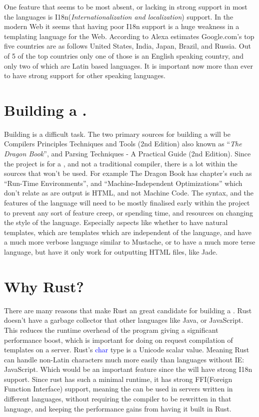 One feature that seems to be most absent, or lacking in strong support in most the languages is I18n(\textit{Internationalization and localization}) support. In the modern Web it seems that having poor I18n support is a huge weakness in a templating language for the Web. According to Alexa estimates Google.com's top five countries are as follows United States, India, Japan, Brazil, and Russia. Out of 5 of the top countries only one of those is an English speaking country, and only two of which are Latin based languages. It is important now more than ever to have strong support for other speaking languages.
\newpage
\section{Building a \compiler{}.}
Building \compiler{} is a difficult task. The two primary sources for building a \compiler{} will be Compilers Principles Techniques and Tools (2nd Edition) also known as ``\textit{The Dragon Book}''\cite{DragonBook}, and Parsing Techniques - A Practical Guide (2nd Edition)\cite{ParseTech}. Since the project is for a \compiler{}, and not a traditional compiler, there is a lot within the sources that won't be used. For example The Dragon Book has chapter's such as ``Run-Time Environments'', and ``Machine-Independent Optimizations'' which don't relate as are output is HTML, and not Machine Code. The syntax, and the features of the language will need to be mostly finalised early within the project to prevent any sort of feature creep, or spending time, and resources on changing the style of the language. Especially aspects like whether to have natural templates, which are templates which are independent of the language, and have a much more verbose language similar to Mustache\cite{Mustache}, or to have a much more terse language, but have it only work for outputting HTML files, like Jade\cite{Jade}. 

\section{Why Rust?}
There are many reasons that make Rust an great candidate for building a \compiler{}. Rust doesn't have a garbage collector that other languages like Java, or JavaScript. This reduces the runtime overhead of the program giving a significant performance boost, which is important for doing on request compilation of templates on a server. Rust's \textcolor{blue}{char} type is a Unicode scalar value. Meaning Rust can handle non-Latin characters much more easily than languages without IE: JavaScript. Which would be an important feature since the \languageName{} will have strong I18n support. Since rust has such a minimal runtime, it has strong FFI(Foreign Function Interface) support, meaning the \compiler{} can be used in servers written in different languages, without requiring the compiler to be rewritten in that language, and keeping the performance gains from having it built in Rust. 


